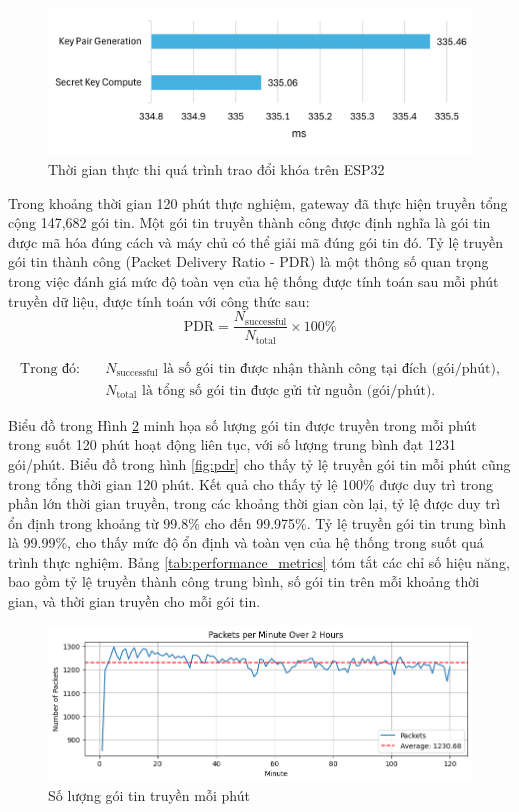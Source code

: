 \begin{figure}[H]
    \centering
    \includegraphics[width=0.75\linewidth]{ke.png}
    \caption{Thời gian thực thi quá trình trao đổi khóa trên ESP32}
    \label{fig:ke}
\end{figure}

Trong khoảng thời gian 120 phút thực nghiệm, gateway đã thực hiện truyền tổng cộng 147,682 gói tin. Một gói tin truyền thành công được định nghĩa là gói tin được mã hóa đúng cách và máy chủ có thể giải mã đúng gói tin đó. Tỷ lệ truyền gói tin thành công (Packet Delivery Ratio - PDR) là một thông số quan trọng trong việc đánh giá mức độ toàn vẹn của hệ thống được tính toán sau mỗi phút truyền dữ liệu, được tính toán với công thức sau:
\[
\text{PDR} = \frac{N_{\text{successful}}}{N_{\text{total}}} \times 100\% 
\]

\begin{align*}
\text{Trong đó:} \quad & N_{\text{successful}} \text{ là số gói tin được nhận thành công tại đích (gói/phút),} \\
                       & N_{\text{total}} \text{ là tổng số gói tin được gửi từ nguồn (gói/phút).}
\end{align*}

Biểu đồ trong Hình \ref{fig:packet} minh họa số lượng gói tin được truyền trong mỗi phút trong suốt 120 phút hoạt động liên tục, với số lượng trung bình đạt 1231 gói/phút. Biểu đồ trong hình \ref{fig:pdr} cho thấy tỷ lệ truyền gói tin mỗi phút cũng trong tổng thời gian 120 phút. Kết quả cho thấy tỷ lệ 100\% được duy trì trong phần lớn thời gian truyền, trong các khoảng thời gian còn lại, tỷ lệ được duy trì ổn định trong khoảng từ 99.8\% cho đến 99.975\%. Tỷ lệ truyền gói tin trung bình là 99.99\%, cho thấy mức độ ổn định và toàn vẹn của hệ thống trong suốt quá trình thực nghiệm. Bảng \ref{tab:performance_metrics} tóm tắt các chỉ số hiệu năng, bao gồm tỷ lệ truyền thành công trung bình, số gói tin trên mỗi khoảng thời gian, và thời gian truyền cho mỗi gói tin.

\begin{figure}[H]
    \centering
    \includegraphics[width=0.8\linewidth]{packet2.png}
    \caption{Số lượng gói tin truyền mỗi phút}
    \label{fig:packet}
\end{figure}

